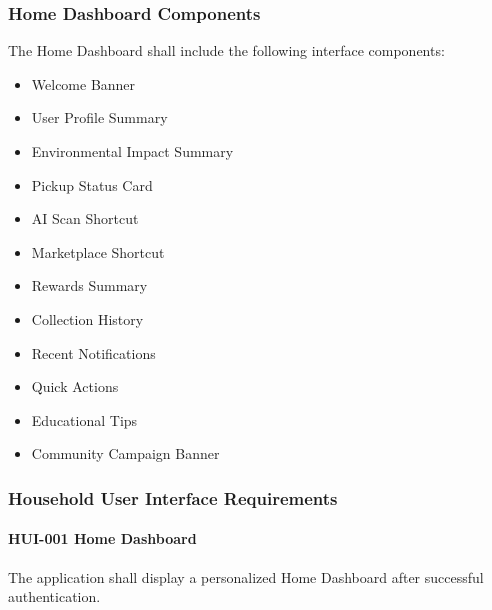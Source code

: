 
\subsubsection*{Home Dashboard Components}

The Home Dashboard shall include the following interface components:

\begin{itemize}

\item Welcome Banner

\item User Profile Summary

\item Environmental Impact Summary

\item Pickup Status Card

\item AI Scan Shortcut

\item Marketplace Shortcut

\item Rewards Summary

\item Collection History

\item Recent Notifications

\item Quick Actions

\item Educational Tips

\item Community Campaign Banner

\end{itemize}


\subsubsection*{Household User Interface Requirements}

\paragraph{HUI-001 Home Dashboard}

The application shall display a personalized Home Dashboard after
successful authentication.

